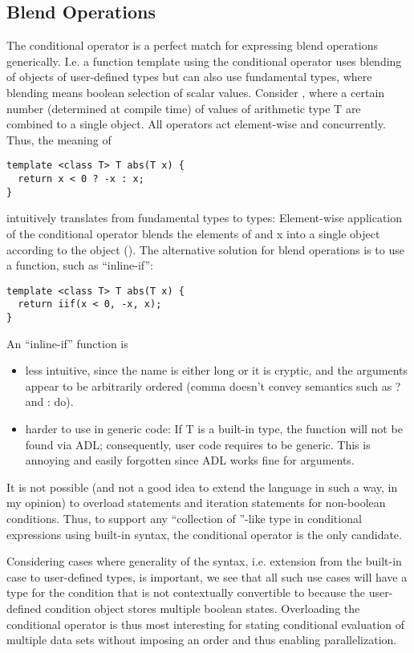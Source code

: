 \subsection{Blend Operations}
The conditional operator is a perfect match for expressing blend operations generically.
I.e. a function template using the conditional operator uses blending of objects of user-defined types but can also use fundamental types, where blending means boolean selection of scalar values.
Consider  \cite[§9]{N4808}, where a certain number (determined at compile time) of values of arithmetic type \type T are combined to a single object.
All operators act element-wise and concurrently.
Thus, the meaning of
\smallskip\begin{lstlisting}[style=Vc]
template <class T> T abs(T x) {
  return x < 0 ? -x : x;
}
\end{lstlisting}
intuitively translates from fundamental types to  types:
Element-wise application of the conditional operator blends the elements of  and \code x into a single  object according to the  object ().
The alternative solution for  blend operations is to use a function, such as “inline-if”:
\smallskip\begin{lstlisting}[style=Vc]
template <class T> T abs(T x) {
  return iif(x < 0, -x, x);
}
\end{lstlisting}
An “inline-if” function is
\begin{itemize}
  \item less intuitive, since the name is either long or it is cryptic, and the arguments appear to be arbitrarily ordered (comma doesn't convey semantics such as \code ? and \code : do).
  \item harder to use in generic code:
    If \type T is a built-in type, the  function will not be found via ADL; consequently, user code requires  to be generic.
    This is annoying and easily forgotten since ADL works fine for  arguments.
\end{itemize}

It is not possible (and not a good idea to extend the language in such a way, in my opinion) to overload  statements and iteration statements for non-boolean conditions.
Thus, to support any “collection of \bool{}”-like type in conditional expressions using built-in syntax, the conditional operator is the only candidate.

Considering cases where generality of the syntax, i.e. extension from the built-in case to user-defined types, is important, we see that all such use cases will have a type for the condition that is not contextually convertible to \bool because the user-defined condition object stores multiple boolean states.
Overloading the conditional operator is thus most interesting for stating conditional evaluation of multiple data sets without imposing an order and thus enabling parallelization.

